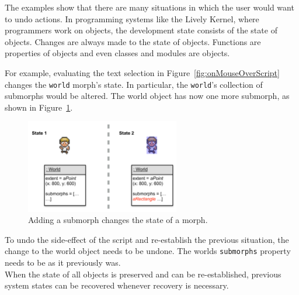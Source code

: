 The examples show that there are many situations in which the user would want to undo actions.
In programming systems like the Lively Kernel, where programmers work on objects, the development state consists of the state of objects.
Changes are always made to the state of objects.
Functions are properties of objects and even classes and modules are objects.

For example, evaluating the text selection in Figure~\ref{fig:onMouseOverScript} changes the \lstinline{world} morph's state.
In particular, the \lstinline{world}'s collection of submorphs would be altered.
The world object has now one more submorph, as shown in Figure~\ref{fig:changedCharacter}.

\begin{figure}[h]
    \centering
    \includegraphics[width=0.6\textwidth]{figures/3_motivation/5_stateChanges.pdf}
    \caption{Adding a submorph changes the state of a morph.}
    \label{fig:changedCharacter}
\end{figure}

To undo the side-effect of the script and re-establish the previous situation, the change to the world object needs to be undone.
The worlds \lstinline{submorphs} property needs to be as it previously was.\\
When the state of all objects is preserved and can be re-established, previous system states can be recovered whenever recovery is necessary.
